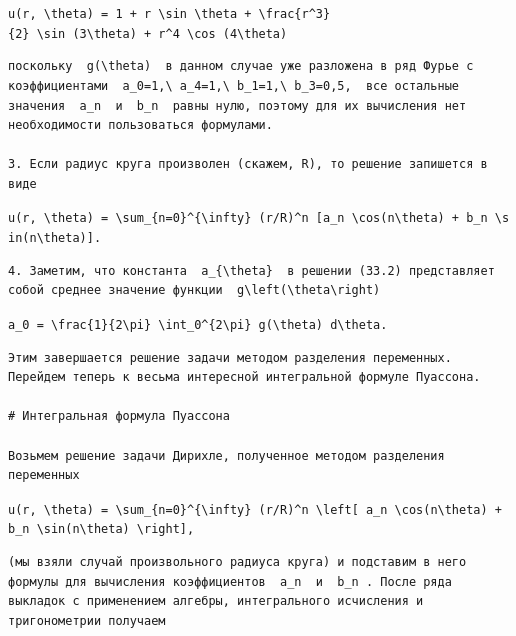 \documentclass[
  ukrainian,
]{article}
\begin{document}
\texttt{u(r,\ \textbackslash{}theta)\ =\ 1\ +\ r\ \textbackslash{}sin\ \textbackslash{}theta\ +\ \textbackslash{}frac\{r\^{}3\}\{2\}\ \textbackslash{}sin\ (3\textbackslash{}theta)\ +\ r\^{}4\ \textbackslash{}cos\ (4\textbackslash{}theta)}

\begin{verbatim}
поскольку  g(\theta)  в данном случае уже разложена в ряд Фурье с коэффициентами  a_0=1,\ a_4=1,\ b_1=1,\ b_3=0,5,  все остальные значения  a_n  и  b_n  равны нулю, поэтому для их вычисления нет необходимости пользоваться формулами.

3. Если радиус круга произволен (скажем, R), то решение запишется в виде
\end{verbatim}

\texttt{u(r,\ \textbackslash{}theta)\ =\ \textbackslash{}sum\_\{n=0\}\^{}\{\textbackslash{}infty\}\ (r/R)\^{}n\ {[}a\_n\ \textbackslash{}cos(n\textbackslash{}theta)\ +\ b\_n\ \textbackslash{}sin(n\textbackslash{}theta){]}.}

\begin{verbatim}
4. Заметим, что константа  a_{\theta}  в решении (33.2) представляет собой среднее значение функции  g\left(\theta\right)
\end{verbatim}

\texttt{a\_0\ =\ \textbackslash{}frac\{1\}\{2\textbackslash{}pi\}\ \textbackslash{}int\_0\^{}\{2\textbackslash{}pi\}\ g(\textbackslash{}theta)\ d\textbackslash{}theta.}

\begin{verbatim}
Этим завершается решение задачи методом разделения переменных. Перейдем теперь к весьма интересной интегральной формуле Пуассона.

# Интегральная формула Пуассона

Возьмем решение задачи Дирихле, полученное методом разделения переменных
\end{verbatim}

\texttt{u(r,\ \textbackslash{}theta)\ =\ \textbackslash{}sum\_\{n=0\}\^{}\{\textbackslash{}infty\}\ (r/R)\^{}n\ \textbackslash{}left{[}\ a\_n\ \textbackslash{}cos(n\textbackslash{}theta)\ +\ b\_n\ \textbackslash{}sin(n\textbackslash{}theta)\ \textbackslash{}right{]},}

\begin{verbatim}
(мы взяли случай произвольного радиуса круга) и подставим в него формулы для вычисления коэффициентов  a_n  и  b_n . После ряда выкладок с применением алгебры, интегрального исчисления и тригонометрии получаем
\end{verbatim}
\end{document}
